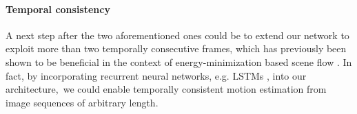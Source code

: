 \paragraph{Temporal consistency}
A next step after the two aforementioned ones could be to extend our network to exploit more than two
temporally consecutive frames, which has previously been shown to be beneficial in the
context of energy-minimization based scene flow \cite{TemporalSF}.
In fact, by incorporating recurrent neural networks, e.g. LSTMs \cite{LSTM},
into our architecture, we could enable temporally consistent motion estimation
from image sequences of arbitrary length.
